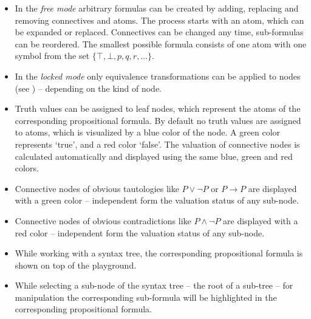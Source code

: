 \begin{itemize}

\item In the {\em free mode} arbitrary formulas can be created by adding, replacing and removing connectives and atoms. The process starts with an atom, which can be expanded or replaced. 
Connectives can be changed any time, sub-formulas can be reordered.
The smallest possible formula consists of one atom with one symbol from the set $\{ \top, \bot, p, q, r, … \}$.

\item In the {\em locked mode} only equivalence transformations can be applied to nodes (see )
– depending on the kind of node. 

\item Truth values can be assigned to leaf nodes, 
which represent the atoms of the corresponding propositional formula. 
By default no truth values are assigned to atoms, which is visualized by a blue color of the node.
A green color represents ‘true’, and a red color ‘false’.
The valuation of connective nodes is calculated automatically 
and displayed using the same blue, green and red colors.

\item Connective nodes of obvious tautologies like
$P \vee \neg P$ or
$P \rightarrow P$ are displayed with a green color – 
independent form the valuation status of any sub-node.

\item Connective nodes of obvious contradictions like $P \wedge \neg P$ are displayed with a red color – 
independent form the valuation status of any sub-node.

\item While working with a syntax tree, the corresponding propositional formula is shown on top of the playground.

\item While selecting a sub-node of the syntax tree – the root of a sub-tree – 
for manipulation the corresponding sub-formula will be highlighted in the corresponding propositional formula.

\end{itemize}


